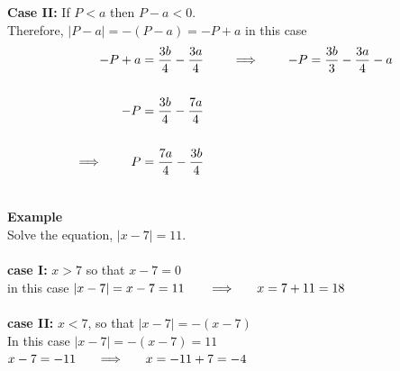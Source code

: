 \documentclass[11pt,a4paper]{article}
\begin{document}
\textbf{Case II:} If $P<a$ then $P-a<0$.\\
Therefore, $|P-a|=-(P-a)=-P+a$ in this case
\begin{align*}
-P+a & = \frac{3b}{4}-\frac{3a}{4}\hspace{0.7cm} \implies \hspace{0.7cm} -P=\frac{3b}{3}-\frac{3a}{4}-a\\\\
- P & = \frac{3b}{4}-\frac{7a}{4}\\\\
\implies \hspace{0.7cm} P & = \frac{7a}{4}-\frac{3b}{4}\\\\
\end{align*}



\textbf{Example}\\
Solve the equation, $|x-7|=11$.\\\\

\textbf{case I:}
$x>7$ so that $x-7=0$\\ in this case $|x-7|=x-7=11\hspace{0.5cm}$
$\implies \hspace{0.5cm} x=7+11=18$\\\\

\textbf{case II:} $x<7$, so that $|x-7|=-(x-7)$\\
In this case $|x-7|=-(x-7)=11$\\
$x-7=-11\hspace{0.5cm} \implies \hspace{0.5cm} x=-11+7=-4$\\\\
\end{document}
